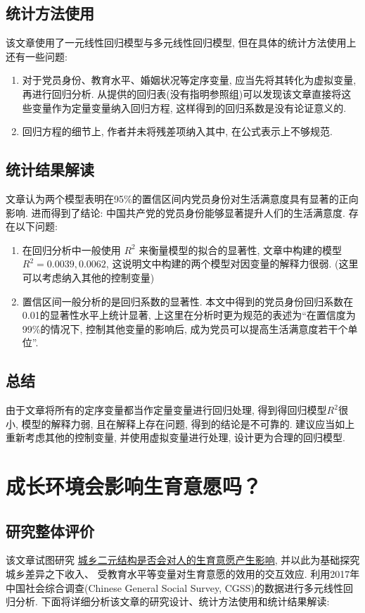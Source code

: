 \documentclass[11pt]{article}
\newcommand\1{\mathds{1}}
\begin{document}
\subsection{统计方法使用}
    该文章使用了一元线性回归模型与多元线性回归模型, 但在具体的统计方法使用上还有一些问题:   
    \begin{enumerate}[label=(\arabic*)]
        \item 对于党员身份、教育水平、婚姻状况等定序变量, 应当先将其转化为虚拟变量, 再进行回归分析. 从提供的回归表(没有指明参照组)可以发现该文章直接将这些变量作为定量变量纳入回归方程, 这样得到的回归系数是没有论证意义的.
        \item 回归方程的细节上, 作者并未将残差项纳入其中, 在公式表示上不够规范. 
    \end{enumerate}
\subsection{统计结果解读}
    文章认为两个模型表明在95\%的置信区间内党员身份对生活满意度具有显著的正向影响. 进而得到了结论: 中国共产党的党员身份能够显著提升人们的生活满意度. 存在以下问题:
    \begin{enumerate}[label=(\arabic*)]
        \item 在回归分析中一般使用 $R^2$ 来衡量模型的拟合的显著性, 文章中构建的模型 $R^2 = 0.0039, 0.0062$, 这说明文中构建的两个模型对因变量的解释力很弱. (这里可以考虑纳入其他的控制变量)
        \item 置信区间一般分析的是回归系数的显著性. 本文中得到的党员身份回归系数在0.01的显著性水平上统计显著, 上这里在分析时更为规范的表述为“在置信度为99\%的情况下, 控制其他变量的影响后, 成为党员可以提高生活满意度若干个单位”. 
    \end{enumerate}

\subsection{总结}
    由于文章将所有的定序变量都当作定量变量进行回归处理, 得到得回归模型$R^2$很小, 模型的解释力弱, 且在解释上存在问题, 得到的结论是不可靠的. 建议应当如上重新考虑其他的控制变量, 并使用虚拟变量进行处理, 设计更为合理的回归模型.

\section{成长环境会影响生育意愿吗？}
\subsection{研究整体评价}
    该文章试图研究 \underline{城乡二元结构是否会对人的生育意愿产生影响}, 并以此为基础探究 城乡差异之下收入、
    受教育水平等变量对生育意愿的效用的交互效应. 利用2017年中国社会综合调查(Chinese General Social Survey, CGSS)的数据进行多元线性回归分析. 
    下面将详细分析该文章的研究设计、统计方法使用和统计结果解读:
\end{document}
